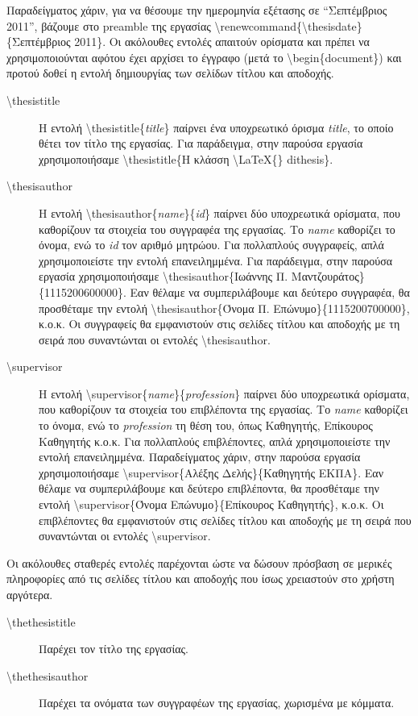 \documentclass{dithesis}
\begin{document}
Παραδείγματος χάριν, για να θέσουμε την ημερομηνία εξέτασης σε ``Σεπτέμβριος
2011'', βάζουμε στο preamble της εργασίας 
\textbackslash{renewcommand}\{\textbackslash{thesisdate}\}\{Σεπτέμβριος 2011\}.
Οι ακόλουθες εντολές απαιτούν ορίσματα και πρέπει να χρησιμοποιούνται αφότου
έχει αρχίσει το έγγραφο (μετά το \textbackslash{begin}\{document\}) και προτού
δοθεί η εντολή δημιουργίας των σελίδων τίτλου και αποδοχής.
\begin{description}
\item[\textbackslash{thesistitle}]
  Η εντολή \textbackslash{thesistitle}\{\textit{title}\} παίρνει ένα 
  υποχρεωτικό όρισμα \textit{title}, το οποίο θέτει τον τίτλο της εργασίας.
  Για παράδειγμα, στην παρούσα εργασία χρησιμοποιήσαμε
  \textbackslash{thesistitle}\{Η κλάσση \textbackslash{LaTeX}\{\} dithesis\}.
\item[\textbackslash{thesisauthor}]
  Η εντολή \textbackslash{thesisauthor}\{\textit{name}\}\{\textit{id}\} παίρνει
  δύο υποχρεωτικά ορίσματα, που καθορίζουν τα στοιχεία του συγγραφέα της
  εργασίας.
  Το \textit{name} καθορίζει το όνομα, ενώ το \textit{id} τον αριθμό μητρώου.
  Για πολλαπλούς συγγραφείς, απλά χρησιμοποιείστε την εντολή επανειλημμένα.
  Για παράδειγμα, στην παρούσα εργασία χρησιμοποιήσαμε
  \textbackslash{thesisauthor}\{Ιωάννης Π. Μαντζουράτος\}\{1115200600000\}.
  Εαν θέλαμε να συμπεριλάβουμε και δεύτερο συγγραφέα, θα προσθέταμε την εντολή 
  \textbackslash{thesisauthor}\{Όνομα Π. Επώνυμο\}\{1115200700000\}, κ.ο.κ.
  Οι συγγραφείς θα εμφανιστούν στις σελίδες τίτλου και αποδοχής με τη σειρά
  που συναντώνται οι εντολές \textbackslash{thesisauthor}.
\item[\textbackslash{supervisor}]
  Η εντολή \textbackslash{supervisor}\{\textit{name}\}\{\textit{profession}\} 
  παίρνει δύο υποχρεωτικά ορίσματα, που καθορίζουν τα στοιχεία του επιβλέποντα
  της εργασίας.
  Το \textit{name} καθορίζει το όνομα, ενώ το \textit{profession} τη θέση του,
  όπως Καθηγητής, Επίκουρος Καθηγητής κ.ο.κ.
  Για πολλαπλούς επιβλέποντες, απλά χρησιμοποιείστε την εντολή επανειλημμένα.
  Παραδείγματος χάριν, στην παρούσα εργασία χρησιμοποιήσαμε
  \textbackslash{supervisor}\{Αλέξης Δελής\}\{Καθηγητής ΕΚΠΑ\}.
  Εαν θέλαμε να συμπεριλάβουμε και δεύτερο επιβλέποντα, θα προσθέταμε την 
  εντολή \textbackslash{supervisor}\{Όνομα Επώνυμο\}\{Επίκουρος Καθηγητής\}, 
  κ.ο.κ.
  Οι επιβλέποντες θα εμφανιστούν στις σελίδες τίτλου και αποδοχής με τη σειρά
  που συναντώνται οι εντολές \textbackslash{supervisor}.
\end{description}
Οι ακόλουθες σταθερές εντολές παρέχονται ώστε να δώσουν πρόσβαση σε μερικές 
πληροφορίες από τις σελίδες τίτλου και αποδοχής που ίσως χρειαστούν στο χρήστη 
αργότερα.
\begin{description}
\item[\textbackslash{thethesistitle}]
  Παρέχει τον τίτλο της εργασίας.
\item[\textbackslash{thethesisauthor}]
  Παρέχει τα ονόματα των συγγραφέων της εργασίας, χωρισμένα με κόμματα.
\end{description}
\end{document}
